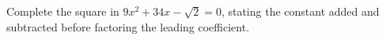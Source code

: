 Complete the square in $9x^2+34x-\sqrt2=0$, stating the constant added and subtracted before factoring the leading coefficient.
